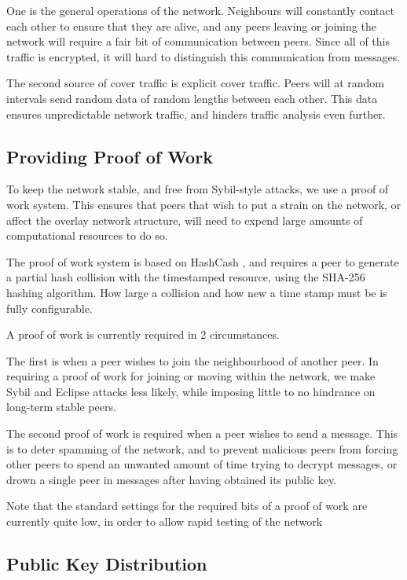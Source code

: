 One is the general operations of the network. Neighbours will constantly contact each other to ensure that they are alive, and any peers leaving or joining the network will require a fair bit of communication between peers. Since all of this traffic is encrypted, it will hard to distinguish this communication from messages.

The second source of cover traffic is explicit cover traffic. Peers will at random intervals send random data of random lengths between each other. This data ensures unpredictable network traffic, and hinders traffic analysis even further.

\subsection{Providing Proof of Work}

To keep the network stable, and free from Sybil-style attacks, we use a proof of work system. This ensures that peers that wish to put a strain on the network, or affect the overlay network structure, will need to expend large amounts of computational resources to do so.

The proof of work system is based on HashCash \citep{HashCash}, and requires a peer to generate a partial hash collision with the timestamped resource, using the SHA-256 hashing algorithm. How large a collision and how new a time stamp must be is fully configurable.

A proof of work is currently required in 2 circumstances.

The first is when a peer wishes to join the neighbourhood of another peer. In requiring a proof of work for joining or moving within the network, we make Sybil and Eclipse attacks less likely, while imposing little to no hindrance on long-term stable peers.

The second proof of work is required when a peer wishes to send a message. This is to deter spamming of the network, and to prevent malicious peers from forcing other peers to spend an unwanted amount of time trying to decrypt messages, or drown a single peer in messages after having obtained its public key.

Note that the standard settings for the required bits of a proof of work are currently quite low, in order to allow rapid testing of the network

\subsection{Public Key Distribution}

